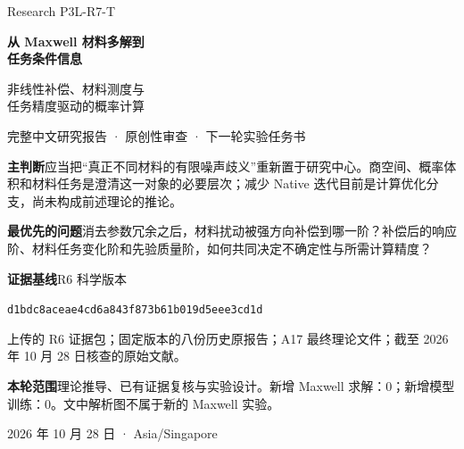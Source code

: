 \documentclass[11pt,a4paper]{article}
\begin{document}
\begin{titlepage}
\vspace*{10mm}
{\Large Research P3L-R7-T\par}
\vspace{8mm}
{\Huge\bfseries 从 Maxwell 材料多解到\\[.3em]任务条件信息\par}
\vspace{7mm}
{\LARGE 非线性补偿、材料测度与\\任务精度驱动的概率计算\par}
\vspace{10mm}
{\large 完整中文研究报告 · 原创性审查 · 下一轮实验任务书\par}
\vspace{12mm}
\begin{tcolorbox}
\textbf{主判断}\quad 应当把“真正不同材料的有限噪声歧义”重新置于研究中心。商空间、概率体积和材料任务是澄清这一对象的必要层次；减少 Native 迭代目前是计算优化分支，尚未构成前述理论的推论。

\textbf{最优先的问题}\quad 消去参数冗余之后，材料扰动被强方向补偿到哪一阶？补偿后的响应阶、材料任务变化阶和先验质量阶，如何共同决定不确定性与所需计算精度？
\end{tcolorbox}
\vfill
\textbf{证据基线}\quad R6 科学版本
\par\small\texttt{d1bdc8aceae4cd6a843f873b61b019d5eee3cd1d}
\par\normalsize
上传的 R6 证据包；固定版本的八份历史原报告；A17 最终理论文件；截至 2026 年 10 月 28 日核查的原始文献。
\vspace{6mm}
\par\textbf{本轮范围}\quad 理论推导、已有证据复核与实验设计。新增 Maxwell 求解：0；新增模型训练：0。文中解析图不属于新的 Maxwell 实验。
\vspace{6mm}
\par 2026 年 10 月 28 日 · Asia/Singapore
\end{titlepage}
\tableofcontents
\newpage









\end{document}

